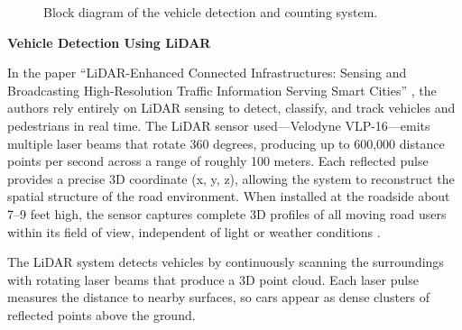 \documentclass[11pt, a4paper]{report}
\begin{document}
\begin{figure}[H]
\begin{center}
\end{center}
\caption{Block diagram of the vehicle detection and counting system.}
\label{fig:vehicle_detection_camera}
\end{figure}

\textbf{Vehicle Detection Using LiDAR}

In the paper ``LiDAR-Enhanced Connected Infrastructures: Sensing and Broadcasting High-Resolution Traffic Information Serving Smart Cities'' \cite{lv2019lidar}, the authors rely entirely on LiDAR sensing to detect, classify, and track vehicles and pedestrians in real time. The LiDAR sensor used---Velodyne VLP-16---emits multiple laser beams that rotate 360 degrees, producing up to 600,000 distance points per second across a range of roughly 100 meters. Each reflected pulse provides a precise 3D coordinate (x, y, z), allowing the system to reconstruct the spatial structure of the road environment. When installed at the roadside about 7--9 feet high, the sensor captures complete 3D profiles of all moving road users within its field of view, independent of light or weather conditions \cite{lv2019lidar}.

The LiDAR system detects vehicles by continuously scanning the surroundings with rotating laser beams that produce a 3D point cloud. Each laser pulse measures the distance to nearby surfaces, so cars appear as dense clusters of reflected points above the ground.
\end{document}
